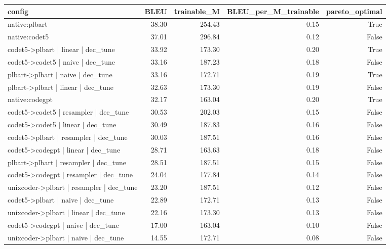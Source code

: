 \begin{tabular}{lrrrr}
\toprule
config & BLEU & trainable_M & BLEU_per_M_trainable & pareto_optimal \\
\midrule
native:plbart & 38.30 & 254.43 & 0.15 & True \\
native:codet5 & 37.01 & 296.84 & 0.12 & False \\
codet5->plbart | linear | dec_tune & 33.92 & 173.30 & 0.20 & True \\
codet5->codet5 | naive | dec_tune & 33.16 & 187.23 & 0.18 & False \\
plbart->plbart | naive | dec_tune & 33.16 & 172.71 & 0.19 & True \\
plbart->plbart | linear | dec_tune & 32.63 & 173.30 & 0.19 & False \\
native:codegpt & 32.17 & 163.04 & 0.20 & True \\
codet5->codet5 | resampler | dec_tune & 30.53 & 202.03 & 0.15 & False \\
codet5->codet5 | linear | dec_tune & 30.49 & 187.83 & 0.16 & False \\
codet5->plbart | resampler | dec_tune & 30.03 & 187.51 & 0.16 & False \\
codet5->codegpt | linear | dec_tune & 28.71 & 163.63 & 0.18 & False \\
plbart->plbart | resampler | dec_tune & 28.51 & 187.51 & 0.15 & False \\
codet5->codegpt | resampler | dec_tune & 24.04 & 177.84 & 0.14 & False \\
unixcoder->plbart | resampler | dec_tune & 23.20 & 187.51 & 0.12 & False \\
codet5->plbart | naive | dec_tune & 22.89 & 172.71 & 0.13 & False \\
unixcoder->plbart | linear | dec_tune & 22.16 & 173.30 & 0.13 & False \\
codet5->codegpt | naive | dec_tune & 17.00 & 163.04 & 0.10 & False \\
unixcoder->plbart | naive | dec_tune & 14.55 & 172.71 & 0.08 & False \\
\bottomrule
\end{tabular}
